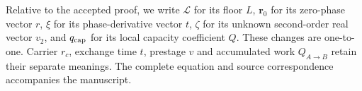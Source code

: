 Relative to the accepted proof, we write $\mathcal L$ for its floor $L$, $\mathbf r_0$ for its zero-phase vector $r$, $\xi$ for its phase-derivative vector $t$, $\zeta$ for its unknown second-order real vector $v_2$, and $q_{\rm cap}$ for its local capacity coefficient $Q$. These changes are one-to-one. Carrier $r_c$, exchange time $t$, prestage $v$ and accumulated work $Q_{A\to B}$ retain their separate meanings. The complete equation and source correspondence accompanies the manuscript.
